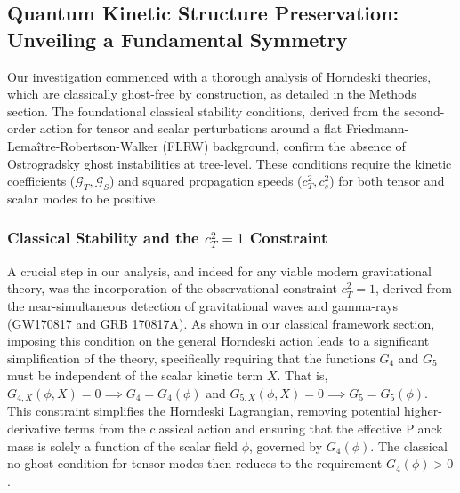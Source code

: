 \documentclass[twocolumn]{aastex631}
\begin{document}
\subsection{Quantum Kinetic Structure Preservation: Unveiling a Fundamental Symmetry}

Our investigation commenced with a thorough analysis of Horndeski theories, which are classically ghost-free by construction, as detailed in the Methods section. The foundational classical stability conditions, derived from the second-order action for tensor and scalar perturbations around a flat Friedmann-Lemaître-Robertson-Walker (FLRW) background, confirm the absence of Ostrogradsky ghost instabilities at tree-level. These conditions require the kinetic coefficients ($\mathcal{G}_T, \mathcal{G}_S$) and squared propagation speeds ($c_T^2, c_s^2$) for both tensor and scalar modes to be positive.

\subsubsection{Classical Stability and the $c_T^2=1$ Constraint}
A crucial step in our analysis, and indeed for any viable modern gravitational theory, was the incorporation of the observational constraint $c_T^2=1$, derived from the near-simultaneous detection of gravitational waves and gamma-rays (GW170817 and GRB 170817A). As shown in our classical framework section, imposing this condition on the general Horndeski action leads to a significant simplification of the theory, specifically requiring that the functions $G_4$ and $G_5$ must be independent of the scalar kinetic term $X$. That is, $G_{4,X}(\phi, X) = 0 \implies G_4 = G_4(\phi)$ and $G_{5,X}(\phi, X) = 0 \implies G_5 = G_5(\phi)$. This constraint simplifies the Horndeski Lagrangian, removing potential higher-derivative terms from the classical action and ensuring that the effective Planck mass is solely a function of the scalar field $\phi$, governed by $G_4(\phi)$. The classical no-ghost condition for tensor modes then reduces to the requirement $G_4(\phi) > 0$.
\end{document}
